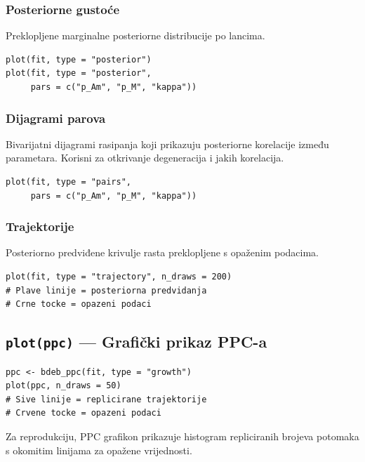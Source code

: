 \documentclass[11pt,a4paper]{article}
\newcommand{\code}[1]{\texttt{#1}}
\begin{document}
\subsubsection{Posteriorne gustoće}

Preklopljene marginalne posteriorne distribucije po lancima.

\begin{lstlisting}
plot(fit, type = "posterior")
plot(fit, type = "posterior",
     pars = c("p_Am", "p_M", "kappa"))
\end{lstlisting}

\subsubsection{Dijagrami parova}

Bivarijatni dijagrami rasipanja koji prikazuju posteriorne korelacije
između parametara.  Korisni za otkrivanje degeneracija i jakih korelacija.

\begin{lstlisting}
plot(fit, type = "pairs",
     pars = c("p_Am", "p_M", "kappa"))
\end{lstlisting}

\subsubsection{Trajektorije}

Posteriorno predviđene krivulje rasta preklopljene s opaženim podacima.

\begin{lstlisting}
plot(fit, type = "trajectory", n_draws = 200)
# Plave linije = posteriorna predvidanja
# Crne tocke = opazeni podaci
\end{lstlisting}

\subsection{\code{plot(ppc)} --- Grafički prikaz PPC-a}

\begin{lstlisting}
ppc <- bdeb_ppc(fit, type = "growth")
plot(ppc, n_draws = 50)
# Sive linije = replicirane trajektorije
# Crvene tocke = opazeni podaci
\end{lstlisting}

Za reprodukciju, PPC grafikon prikazuje histogram repliciranih brojeva
potomaka s okomitim linijama za opažene vrijednosti.


\end{document}
